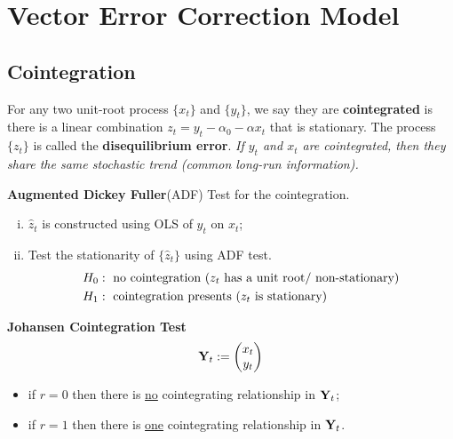 \documentclass[11pt]{article}
\begin{document}
	    
	\section{Vector Error Correction Model}
		\subsection{Cointegration}
		    \begin{definition}
		        For any two unit-root process $\{x_t\}$ and $\{y_t\}$, we say they are \textbf{cointegrated} is there is a linear combination $z_t = y_t - \alpha_0 - \alpha x_t$ that is stationary. The process $\{z_t\}$ is called the \textbf{disequilibrium error}. \emph{If $y_t$ and $x_t$ are cointegrated, then they share the same stochastic trend (common long-run information).}
		    \end{definition}
		    
		    \begin{remark}
		        \textbf{Augmented Dickey Fuller}(ADF) Test for the cointegration.
		        \begin{enumerate}[(i)]
		            \item $\hat{z}_t$ is constructed using OLS of $y_t$ on $x_t$;
		            \item Test the stationarity of $\{\hat{z}_t\}$ using ADF test.
		            \begin{align}
		                H_0 &: \text{{ no cointegration ($z_t$ has a unit root/ non-stationary)}} \\
		                H_1 &: \text{{ cointegration presents ($z_t$ is stationary)}}
		            \end{align}
		        \end{enumerate}
		    \end{remark}
		    
		    \begin{remark}
		        \textbf{Johansen Cointegration Test}
		        \begin{equation}
		            \textbf{Y}_t := \begin{pmatrix}x_t \\ y_t \end{pmatrix}
		        \end{equation}
		        \begin{itemize}
		            \item if $r=0$ then there is \ul{no} cointegrating relationship in $\textbf{Y}_t$;
		            \item if $r=1$ then there is \ul{one} cointegrating relationship in $\textbf{Y}_t$.
		        \end{itemize}
		    \end{remark}
\end{document}
